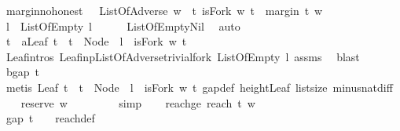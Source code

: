 \begin{isabellebody}
\isanewline
{}\isamarkupfalse%
\ margin{\isacharunderscore}no{\isacharunderscore}honest\ {\isacharcolon}\ \ {\isachardoublequoteopen}ListOfAdverse\ w{\isachardoublequoteclose}\ \ {\isachardoublequoteopen}{\isasymexists}t{\isachardot}\ isFork\ w\ t\ {\isasymand}\ margin\ t\ w\ {\isasymge}\ {}{\isachardoublequoteclose}\isanewline
%
\isadelimproof
%
\endisadelimproof
%
\isatagproof
{}\isamarkupfalse%
\ {\isacharminus}\isanewline
\ \ \ \isamarkupfalse%
\ l\ \ {\isachardoublequoteopen}ListOfEmpty\ l{\isachardoublequoteclose}\isanewline
\ \ \ \ \isamarkupfalse%
\ ListOfEmpty{\isachardot}Nil\ \isamarkupfalse%
\ auto\ \isanewline
\ \ \isamarkupfalse%
\ t\ \ a{\isacharcolon}{\isachardoublequoteopen}Leaf\ t\ {\isasymand}\ t\ {\isacharequal}\ Node\ {}\ l\ {\isasymand}\ isFork\ w\ t{\isachardoublequoteclose}\isanewline
\ \ \ \ \isamarkupfalse%
\ Leaf{\isachardot}intros\ Leaf{\isacharunderscore}inp{\isacharunderscore}ListOfAdverse{\isacharunderscore}trivial{\isacharunderscore}fork\ {\isacartoucheopen}ListOfEmpty\ l{\isacartoucheclose}\ assms\ \isamarkupfalse%
\ blast\isanewline
\ \ \isamarkupfalse%
\ b{\isacharcolon}{\isachardoublequoteopen}gap\ t\ {\isacharbrackleft}{\isacharbrackright}\ {\isacharequal}\ {}{\isachardoublequoteclose}\isanewline
\ \ \ \ \isamarkupfalse%
\ {\isacharparenleft}metis\ {\isacartoucheopen}Leaf\ t\ {\isasymand}\ t\ {\isacharequal}\ Node\ {}\ l\ {\isasymand}\ isFork\ w\ t{\isacartoucheclose}\ gap{\isacharunderscore}def\ height{\isacharunderscore}Leaf\ list{\isachardot}size{\isacharparenleft}{}{\isacharparenright}\ minus{\isacharunderscore}nat{\isachardot}diff{\isacharunderscore}{}{\isacharparenright}\isanewline
\ \ \isamarkupfalse%
\ {\isachardoublequoteopen}reserve\ w\ {\isacharbrackleft}{\isacharbrackright}\ {\isasymge}\ {}{\isachardoublequoteclose}\isanewline
\ \ \ \ \isamarkupfalse%
\ simp\isanewline
\ \ \isamarkupfalse%
\ reachge{}{\isacharcolon}\ {\isachardoublequoteopen}reach\ t\ w\ {\isacharbrackleft}{\isacharbrackright}\ {\isasymge}\ {}{\isachardoublequoteclose}\ \isanewline
\ \ \ \ \isamarkupfalse%
\ {\isacartoucheopen}gap\ t\ {\isacharbrackleft}{\isacharbrackright}\ {\isacharequal}\ {}{\isacartoucheclose}\ reach{\isacharunderscore}def\ \isamarkupfalse%

\end{isabellebody}
